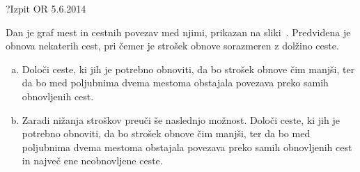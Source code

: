 \begin{naloga}{?}{Izpit OR 5.6.2014}
\begin{vprasanje}
Dan je graf mest in cestnih povezav med njimi, prikazan na sliki~\fig.
Predvidena je obnova nekaterih cest,
pri čemer je strošek obnove sorazmeren z dolžino ceste.

\begin{enumerate}[(a)]
\item Določi ceste, ki jih je potrebno obnoviti,
da bo strošek obnove čim manjši,
ter da bo med poljubnima dvema mestoma
obstajala povezava preko samih obnovljenih cest.

\item Zaradi nižanja stroškov preuči še naslednjo možnost.
Določi ceste, ki jih je potrebno obnoviti, da bo strošek obnove čim manjši,
ter da bo med poljubnima dvema mestoma obstajala povezava
preko samih obnovljenih cest in največ ene neobnovljene ceste.
\end{enumerate}

\begin{slika}
\pgfslika
{}
\end{slika}
\end{vprasanje}
\begin{odgovor}
\end{odgovor}
\end{naloga}
